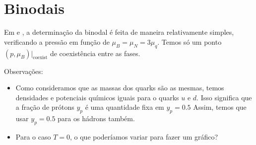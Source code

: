 \chapter{Binodais}

Em \textcite{japoneses} e \textcite{japoneses2}, a determinação da binodal é feita de maneira relativamente simples, verificando a pressão em função de $\mu_B = \mu_N = 3\mu_q$. Temos só um ponto $(p, \mu_B)|_{\textrm{coexist}}$ de coexistência entre as fases.

Observações:
\begin{itemize}
	\item Como consideramos que as massas dos quarks são as mesmas, temos densidades e potenciais químicos iguais para o quarks $u$ e $d$. Isso significa que a fração de prótons $y_p$ é uma quantidade fixa em $y_p = 0.5$ Assim, temos que usar $y_p = 0.5$ para os hádrons também.
	\item Para o caso $T = 0$, o que poderíamos variar para fazer um gráfico? 
\end{itemize}